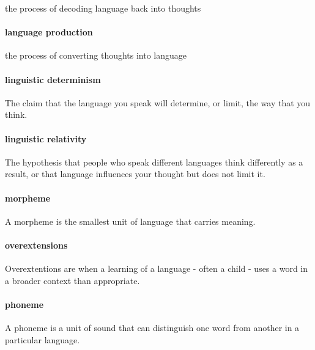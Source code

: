 \documentclass[
]{krantz}
\begin{document}
the process of decoding language back into thoughts

\paragraph*{language production}\label{langproddef}

the process of converting thoughts into language

\paragraph*{linguistic determinism}\label{linguistic-determinism}

The claim that the language you speak will determine, or limit, the way that you think.

\paragraph*{linguistic relativity}\label{linguistic-relativity}

The hypothesis that people who speak different languages think differently as a result, or that language influences your thought but does not limit it.

\paragraph*{morpheme}\label{morpheme}

A morpheme is the smallest unit of language that carries meaning.

\paragraph*{overextensions}\label{overextensions}

Overextentions are when a learning of a language - often a child - uses a word in a broader context than appropriate.

\paragraph*{phoneme}\label{phoneme}

A phoneme is a unit of sound that can distinguish one word from another in a particular language.
\end{document}
